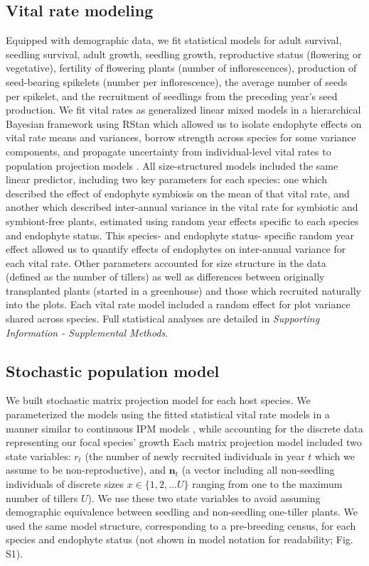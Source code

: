\documentclass[lineno, sn-basic]{sn-jnl}%
\begin{document}
\subsection*{Vital rate modeling}
Equipped with demographic data, we fit statistical models for adult survival, seedling survival, adult growth, seedling growth, reproductive status (flowering or vegetative), fertility of flowering plants (number of inflorescences), production of seed-bearing spikelets (number per inflorescence), the average number of seeds per spikelet, and the recruitment of seedlings from the preceding year's seed production.
We fit vital rates as generalized linear mixed models in a hierarchical Bayesian framework using RStan \citep{rstan2022} which allowed us to isolate endophyte effects on vital rate means and variances, borrow strength across species for some variance components, and propagate uncertainty from individual-level vital rates to population projection models \citep{elderd2016quantifying}. 
All size-structured models included the same linear predictor, including two key parameters for each species: one which described the effect of endophyte symbiosis on the mean of that vital rate, and another which described inter-annual variance in the vital rate for symbiotic and symbiont-free plants, estimated using random year effects specific to each species and endophyte status. 
This species- and endophyte status- specific random year effect allowed us to quantify effects of endophytes on inter-annual variance for each vital rate. 
Other parameters accounted for size structure in the data (defined as the number of tillers) as well as differences between originally transplanted plants (started in a greenhouse) and those which recruited naturally into the plots.
Each vital rate model included a random effect for plot variance shared across species. 
Full statistical analyses are detailed in \emph{Supporting Information - Supplemental Methods}.

\subsection*{Stochastic population model}
We built stochastic matrix projection model for each host species. 
We parameterized the models using the fitted statistical vital rate models in a manner similar to continuous IPM models \citep{ellner2016data}, while accounting for the discrete data representing our focal species' growth \citep{ellner2022critical}
Each matrix projection model included two state variables: $r_{t}$ (the number of newly recruited individuals in year $t$ which we assume to be non-reproductive), and $\textbf{n}_{t}$ (a vector including all non-seedling individuals of discrete sizes $x\in\{1,2,...U\}$ ranging from one to the maximum number of tillers $U$). 
We use these two state variables to avoid assuming demographic equivalence between seedling and non-seedling one-tiller plants. 
We used the same model structure, corresponding to a pre-breeding census, for each species and endophyte status (not shown in model notation for readability; Fig. S1). 
\end{document}
